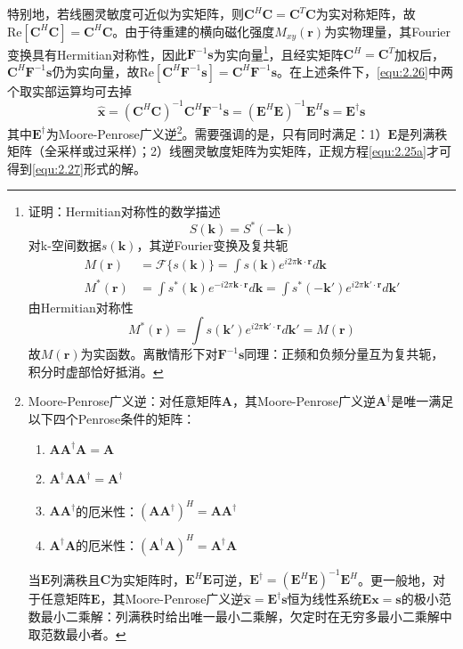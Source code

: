 \documentclass[12pt]{article}
\begin{document}
特别地，若线圈灵敏度可近似为实矩阵，则$\mathbf{C}^H\mathbf{C}=\mathbf{C}^T\mathbf{C}$为实对称矩阵，故$\mathrm{Re}[\mathbf{C}^H\mathbf{C}]=\mathbf{C}^H\mathbf{C}$。由于待重建的横向磁化强度$M_{xy}(\bm{r})$为实物理量，其Fourier变换具有Hermitian对称性，因此$\mathbf{F}^{-1}\bm{s}$为实向量\footnote{证明：Hermitian对称性的数学描述
\begin{equation}
    S(\bm{k})=S^*(-\bm{k})
\end{equation}
对k-空间数据$s(\bm{k})$，其逆Fourier变换及复共轭
\begin{align}
    M(\bm{r})&=\mathcal{F}\{s(\bm{k})\}=\int s(\bm{k})e^{i2\pi\bm{k}\cdot\bm{r}}d\bm{k} \\
    M^*(\bm{r})&=\int s^*(\bm{k})e^{-i2\pi\bm{k}\cdot\bm{r}}d\bm{k}=\int s^*(-\bm{k}')e^{i2\pi\bm{k}'\cdot\bm{r}}d\bm{k}'
\end{align}
由Hermitian对称性
\begin{equation}
    M^*(\bm{r})=\int s(\bm{k}')e^{i2\pi\bm{k}'\cdot\bm{r}}d\bm{k}'=M(\bm{r})
\end{equation}
故$M(\bm{r})$为实函数。离散情形下对$\mathbf{F}^{-1}\bm{s}$同理：正频和负频分量互为复共轭，积分时虚部恰好抵消。}，且经实矩阵$\mathbf{C}^H=\mathbf{C}^T$加权后，$\mathbf{C}^H\mathbf{F}^{-1}\bm{s}$仍为实向量，故$\mathrm{Re}[\mathbf{C}^H\mathbf{F}^{-1}\bm{s}]=\mathbf{C}^H\mathbf{F}^{-1}\bm{s}$。在上述条件下，\autoref{equ:2.26}中两个取实部运算均可去掉
\begin{equation}
    \boxed{\hat{\bm{x}}=\left(\mathbf{C}^H\mathbf{C}\right)^{-1}\mathbf{C}^H\mathbf{F}^{-1}\bm{s}=\left(\mathbf{E}^H\mathbf{E}\right)^{-1}\mathbf{E}^H\bm{s}=\mathbf{E}^\dagger\bm{s}}
    \label{equ:2.27}
\end{equation}
其中$\mathbf{E}^\dagger$为Moore-Penrose广义逆\footnote{Moore-Penrose广义逆：对任意矩阵$\mathbf{A}$，其Moore-Penrose广义逆$\mathbf{A}^\dagger$是唯一满足以下四个Penrose条件的矩阵：
\begin{enumerate}
    \item $\mathbf{A}\mathbf{A}^\dagger\mathbf{A}=\mathbf{A}$
    \item $\mathbf{A}^\dagger\mathbf{A}\mathbf{A}^\dagger=\mathbf{A}^\dagger$
    \item $\mathbf{A}\mathbf{A}^\dagger$的厄米性：$(\mathbf{A}\mathbf{A}^\dagger)^H=\mathbf{A}\mathbf{A}^\dagger$
    \item $\mathbf{A}^\dagger\mathbf{A}$的厄米性：$(\mathbf{A}^\dagger\mathbf{A})^H=\mathbf{A}^\dagger\mathbf{A}$
\end{enumerate}
当$\mathbf{E}$列满秩且$\mathbf{C}$为实矩阵时，$\mathbf{E}^H\mathbf{E}$可逆，$\mathbf{E}^\dagger=(\mathbf{E}^H\mathbf{E})^{-1}\mathbf{E}^H$。更一般地，对于任意矩阵$\mathbf{E}$，其Moore-Penrose广义逆$\hat{\bm{x}}=\mathbf{E}^\dagger\bm{s}$恒为线性系统$\mathbf{E}\bm{x}=\bm{s}$的极小范数最小二乘解：列满秩时给出唯一最小二乘解，欠定时在无穷多最小二乘解中取范数最小者。}。需要强调的是，只有同时满足：1）$\mathbf{E}$是列满秩矩阵（全采样或过采样）；2）线圈灵敏度矩阵为实矩阵，正规方程\autoref{equ:2.25a}才可得到\autoref{equ:2.27}形式的解。
\end{document}
